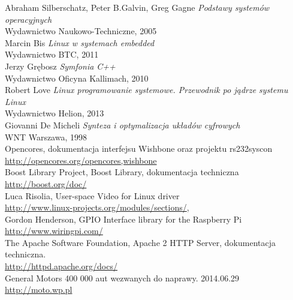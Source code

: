 \begin{thebibliography}{99}
 Abraham Silberschatz, Peter B.Galvin, Greg Gagne {\it Podstawy systemów operacyjnych }\\ Wydawnictwo Naukowo-Techniczne, 2005 \\
 Marcin Bis {\it Linux w systemach embedded }\\ Wydawnictwo BTC, 2011 \\
 Jerzy Grębosz {\it Symfonia C++}\\ Wydawnictwo Oficyna Kallimach, 2010 \\
 Robert Love {\it Linux programowanie systemowe. Przewodnik po jądrze systemu Linux}\\ Wydawnictwo Helion, 2013 \\
 Giovanni De Micheli {\it Synteza i optymalizacja układów cyfrowych}\\ WNT Warszawa, 1998 \\
 Opencores, dokumentacja interfejsu Wishbone oraz projektu rs232syscon\\
		\url{http://opencores.org/opencores,wishbone} 	 \\
 Boost Library Project, Boost Library, dokumentacja techniczna  \\
		\url{http://boost.org/doc/}\\
 Luca Risolia, User-space Video for Linux driver  \\
		\url{http://www.linux-projects.org/modules/sections/}, \\
  Gordon Henderson, GPIO Interface library for the Raspberry Pi\\
		\url{http://www.wiringpi.com/} \\
 The Apache Software Foundation, Apache 2 HTTP Server, dokumentacja techniczna.\\
		\url{http://httpd.apache.org/docs/} \\
General Motors 400 000 aut wezwanych do naprawy. 2014.06.29 \\
		\url{http://moto.wp.pl} \\ 

\end{thebibliography}
